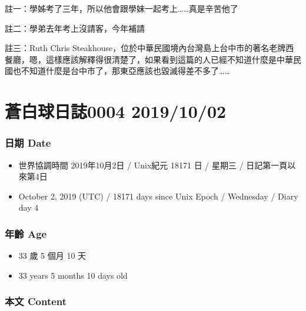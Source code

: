 \documentclass[
]{article}
\providecommand{\tightlist}{%
  \setlength{\itemsep}{0pt}\setlength{\parskip}{0pt}}
\begin{document}
註一：學姊考了三年，所以他會跟學妹一起考上\ldots\ldots 真是辛苦他了

註二：學弟去年考上沒請客，今年補請

註三：Ruth Chris
Steakhouse，位於中華民國境內台灣島上台中市的著名老牌西餐廳，嗯，這樣應該解釋得很清楚了，如果看到這篇的人已經不知道什麼是中華民國也不知道什麼是台中市了，那東亞應該也毀滅得差不多了\ldots\ldots{}

\hypertarget{ux84bcux767dux7403ux65e5ux8a8c0004-20191002}{%
\section{蒼白球日誌0004
2019/10/02}\label{ux84bcux767dux7403ux65e5ux8a8c0004-20191002}}

\hypertarget{ux65e5ux671f-date-1}{%
\subsubsection{日期 Date}\label{ux65e5ux671f-date-1}}

\begin{itemize}
\tightlist
\item
  世界協調時間 2019年10月2日 / Unix紀元 18171 日 / 星期三 /
  日記第一頁以來第4日
\item
  October 2, 2019 (UTC) / 18171 days since Unix Epoch / Wednesday /
  Diary day 4
\end{itemize}

\hypertarget{ux5e74ux9f61-age-1}{%
\subsubsection{年齡 Age}\label{ux5e74ux9f61-age-1}}

\begin{itemize}
\tightlist
\item
  33 歲 5 個月 10 天
\item
  33 years 5 months 10 days old
\end{itemize}

\hypertarget{ux672cux6587-content-1}{%
\subsubsection{本文 Content}\label{ux672cux6587-content-1}}
\end{document}
